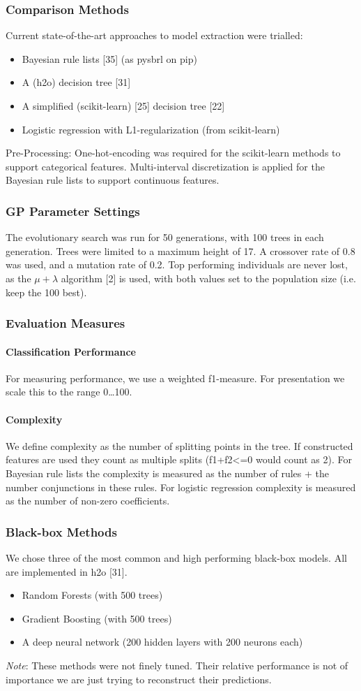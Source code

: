 \subsubsection{Comparison Methods}
Current state-of-the-art approaches to model extraction were trialled:
\begin{itemize}
\item Bayesian rule lists [35] (as pysbrl on pip)
\item A (h2o) decision tree [31]
\item A simplified (scikit-learn) [25] decision tree [22]
\item Logistic regression with L1-regularization (from scikit-learn)
\end{itemize}
Pre-Processing: One-hot-encoding was required for the scikit-learn methods to support categorical features. Multi-interval discretization is applied for the Bayesian rule lists to support continuous features.
\subsubsection{GP Parameter Settings}
The evolutionary search was run for 50 generations, with 100 trees in each generation. Trees were limited to a maximum height of 17. A crossover rate of 0.8 was used, and a mutation rate of 0.2. Top performing individuals are never lost, as the $\mu + \lambda$ algorithm [2] is used, with both values set to the population size (i.e. keep the 100 best).
\subsubsection{Evaluation Measures}
\paragraph{Classification Performance}
For measuring performance, we use a weighted f1-measure. For presentation we scale this to the range 0\ldots100.
\paragraph{Complexity}
We define complexity as the number of splitting points in the tree. If constructed features are used they count as multiple splits (f1+f2<=0 would count as 2). For Bayesian rule lists the complexity is measured as the number of rules + the number conjunctions in these rules. For logistic regression complexity is measured as the number of non-zero coefficients.
\subsubsection{Black-box Methods}
We chose three of the most common and high performing black-box models. All are implemented in h2o [31].
\begin{itemize}
\item Random Forests (with 500 trees)
\item Gradient Boosting (with 500 trees)
\item A deep neural network (200 hidden layers with 200 neurons each)
\end{itemize}
\textit{Note}: These methods were not finely tuned. Their relative performance is not of importance we are just trying to reconstruct their predictions.
